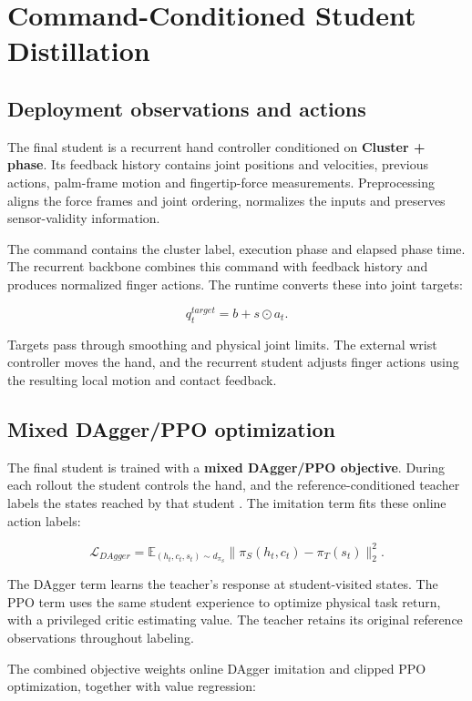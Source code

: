 \documentclass[10pt,twocolumn]{article}
\begin{document}
\section{Command-Conditioned Student Distillation}

\subsection{Deployment observations and actions}

The final student is a recurrent hand controller conditioned on \textbf{Cluster + phase}. Its feedback history contains joint positions and velocities, previous actions, palm-frame motion and fingertip-force measurements. Preprocessing aligns the force frames and joint ordering, normalizes the inputs and preserves sensor-validity information.

The command contains the cluster label, execution phase and elapsed phase time. The recurrent backbone combines this command with feedback history and produces normalized finger actions. The runtime converts these into joint targets:

\[
q_t^{target}=b+s\odot a_t.
\]

Targets pass through smoothing and physical joint limits. The external wrist controller moves the hand, and the recurrent student adjusts finger actions using the resulting local motion and contact feedback.

\subsection{Mixed DAgger/PPO optimization}

The final student is trained with a \textbf{mixed DAgger/PPO objective}. During each rollout the student controls the hand, and the reference-conditioned teacher labels the states reached by that student \citep{ross2011}. The imitation term fits these online action labels:

\[
\mathcal L_{DAgger}=\mathbb E_{(h_t,c_t,s_t)\sim d_{\pi_S}}\|\pi_S(h_t,c_t)-\pi_T(s_t)\|_2^2.
\]

The DAgger term learns the teacher's response at student-visited states. The PPO term uses the same student experience to optimize physical task return, with a privileged critic estimating value. The teacher retains its original reference observations throughout labeling.

The combined objective weights online DAgger imitation and clipped PPO optimization, together with value regression:
\end{document}
